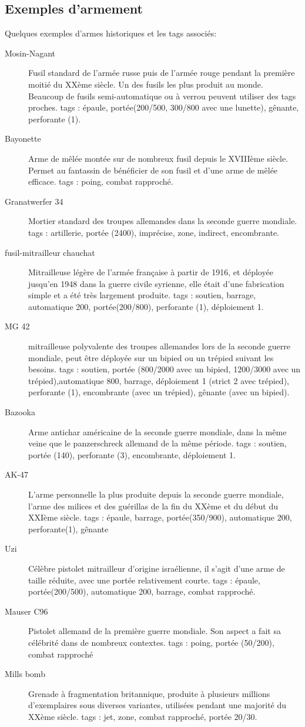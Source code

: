 \documentclass{report}
\begin{document}
\begin{multicols}{2}
\subsection{Exemples d'armement}
Quelques exemples d'armes historiques et les tags associés:
\begin{description}
\item[Mosin-Nagant]Fusil standard de l'armée russe puis de l'armée rouge pendant la première moitié du XXème siècle. Un des fusils les plus produit au monde. Beaucoup de fusils semi-automatique ou à verrou peuvent utiliser des tags proches. tags : épaule, portée(200/500, 300/800 avec une lunette), gênante, perforante (1).
\item[Bayonette]Arme de mêlée montée sur de nombreux fusil depuis le XVIIIème siècle. Permet au fantassin de bénéficier de son fusil et d'une arme de mêlée efficace. tags : poing, combat rapproché.
\item[Granatwerfer 34] Mortier standard des troupes allemandes dans la seconde guerre mondiale. tags : artillerie, portée (2400), imprécise, zone, indirect, encombrante.
\item[fusil-mitrailleur chauchat]Mitrailleuse légère de l'armée française à partir de 1916, et déployée jusqu'en 1948 dans la guerre civile syrienne, elle était d'une fabrication simple et a été très largement produite. tags : soutien, barrage, automatique 200, portée(200/800), perforante (1), déploiement 1.
\item[MG 42] mitrailleuse polyvalente des troupes allemandes lors de la seconde guerre mondiale, peut être déployée sur un bipied ou un trépied suivant les besoins.
tags : soutien, portée (800/2000 avec un bipied, 1200/3000 avec un trépied),automatique 800, barrage, déploiement 1 (strict 2 avec trépied), perforante (1), encombrante (avec un trépied), gênante (avec un bipied).
\item[Bazooka] Arme antichar américaine de la seconde guerre mondiale, dans la même veine que le panzerschreck allemand de la même période. tags : soutien, portée (140), perforante (3), encombrante, déploiement 1.
\item[AK-47]L'arme personnelle la plus produite depuis la seconde guerre mondiale, l'arme des milices et des guérillas de la fin du XXème et du début du XXIème siècle. tags : épaule, barrage, portée(350/900), automatique 200, perforante(1), gênante
\item[Uzi]Célèbre pistolet mitrailleur d'origine israélienne, il s'agit d'une arme de taille réduite, avec une portée relativement courte. tags : épaule, portée(200/500), automatique 200, barrage, combat rapproché.
\item[Mauser C96] Pistolet allemand de la première guerre mondiale. Son aspect a fait sa célébrité dans de nombreux contextes. tags : poing, portée (50/200), combat rapproché
\item[Mills bomb]Grenade à fragmentation britannique, produite à plusieurs millions d'exemplaires sous diverses variantes, utilisées pendant une majorité du XXème siècle. tags : jet, zone, combat rapproché, portée 20/30.


\end{description}
\end{multicols}
\end{document}
